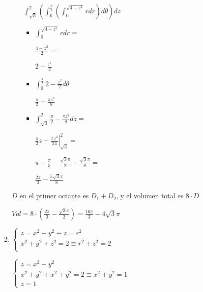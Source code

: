 \documentclass[../practica_09.tex]{subfiles}
\begin{document}
\begin{enumerate}
\begin{enumerate}
                    $\int_{\sqrt{3}}^2 (\int_0^{\frac{\pi}{4}} (\int_0^{\sqrt{4-z^2}} r dr) d\theta) dz$

                    \begin{itemize}
                        \item $\int_0^{\sqrt{4-z^2}} r dr = $
                        
                            $ \frac{4-z^2}{2} = $

                            $ 2 - \frac{z^2}{2} $

                        \item $\int_0^{\frac{\pi}{4}} 2 - \frac{z^2}{2} d\theta$
                        
                            $  \frac{\pi}{2} - \frac{\pi z^2}{8} $

                        \item $\int_{\sqrt{3}}^2 \frac{\pi}{2} - \frac{\pi z^2}{8} dz = $
                        
                            $ \left. \frac{\pi}{2}z - \frac{\pi z^3}{24} \right |_{\sqrt{3}}^2 = $

                            $ \pi - \frac{\pi}{3} - \frac{\sqrt{3}\pi}{2} + \frac{\sqrt{3}\pi}{8} =  $

                            $ \frac{2\pi}{3} - \frac{5\sqrt{3}\pi}{8} $

                    \end{itemize}

            \end{enumerate}

            $D$ en el primer octante es $D_1 + D_2$, y el volumen total es $8\cdot D$

            $Vol = 8 \cdot (\frac{2\pi}{3} - \frac{\sqrt{3}\pi}{2}) = \frac{16\pi}{3} - 4\sqrt{3}\pi$

        \item $\left \{\begin{array}{ll}
            z=x^2+y^2 \equiv z = r^2 \\
            x^2 + y^2 + z^2 = 2 \equiv r^2 + z^2 = 2\\
        \end{array} \right.$

        $\left \{\begin{array}{ll}
            z=x^2+y^2 \\
            x^2 + y^2 + x^2+y^2 = 2 \equiv x^2 + y^2 = 1 \\
            z = 1
        \end{array} \right.$


\end{enumerate}
\end{document}
